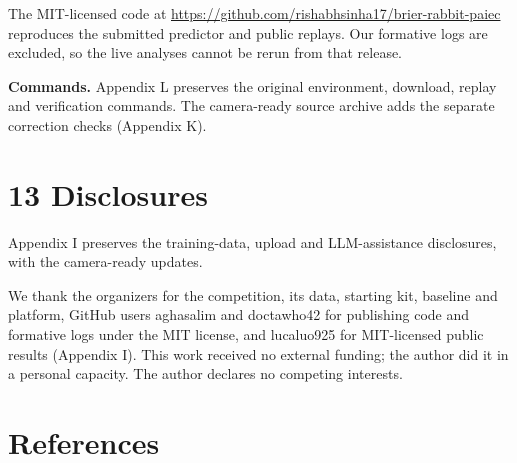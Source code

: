 \documentclass[
]{article}
\begin{document}
The MIT-licensed code at
\url{https://github.com/rishabhsinha17/brier-rabbit-paiec} reproduces
the submitted predictor and public replays. Our formative logs are
excluded, so the live analyses cannot be rerun from that release.

\textbf{Commands.} Appendix L preserves the original environment,
download, replay and verification commands. The camera-ready source
archive adds the separate correction checks (Appendix K).

\section{13 Disclosures}\label{disclosures}

Appendix I preserves the training-data, upload and LLM-assistance
disclosures, with the camera-ready updates.

\begin{ack}
We thank the organizers for the competition, its data, starting kit, baseline and platform,
GitHub users aghasalim and doctawho42 for publishing code and formative logs under the MIT license, and lucaluo925
for MIT-licensed public results (Appendix I). This work received no external funding; the author did it in a personal
capacity. The author declares no competing interests.
\end{ack}

\section{References}\label{references}
\end{document}
